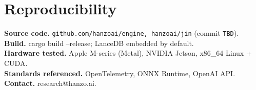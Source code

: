 \documentclass[11pt,letterpaper]{article}
\begin{document}
\section*{Reproducibility}
\textbf{Source code.} \texttt{github.com/hanzoai/engine, hanzoai/jin} (commit \texttt{TBD}).\\
\textbf{Build.} cargo build --release; LanceDB embedded by default.\\
\textbf{Hardware tested.} Apple M-series (Metal), NVIDIA Jetson, x86\_64 Linux + CUDA.\\
\textbf{Standards referenced.} OpenTelemetry, ONNX Runtime, OpenAI API.\\
\textbf{Contact.} research@hanzo.ai.
\end{document}
